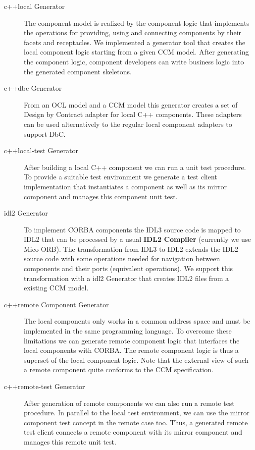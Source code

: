 \begin{description}
\item [c++local Generator]
The component model is realized by the component logic that implements the
operations for providing, using and connecting components by their facets and
receptacles. We implemented a generator tool that creates the local component
logic starting from a given CCM model. After generating the component logic, 
component developers can write business logic into the generated
component skeletons.

\item [c++dbc Generator]
From an OCL model and a CCM model this generator creates a set of
Design by Contract adapter for local C++ components.
These adapters can be used alternatively to the regular local component
adapters to support DbC.

\item [c++local-test Generator]
After building a local C++ component we can run a unit test procedure. To
provide a suitable test environment we generate a test client implementation
that instantiates a component as well as its mirror component and manages this 
component unit test. 

\item [idl2 Generator]
To implement CORBA components the IDL3 source code is mapped to IDL2 that can be
processed by a usual {\bf IDL2 Compiler} (currently we use Mico ORB). The
transformation from IDL3 to IDL2 extends the IDL2 source code with some operations 
needed for navigation between components and their ports (equivalent operations). 
We support this transformation with a idl2 Generator that creates IDL2 files from 
a existing CCM model.

\item [c++remote Component Generator]
The local components only works in a common address space and must be
implemented in the same programming language. To overcome these limitations we
can generate remote component logic that interfaces the local components with CORBA.
The remote component logic is thus a superset of the local component logic. Note
that the external view of such a remote component quite conforms to the CCM
specification.

\item [c++remote-test Generator]
After generation of remote components we can also run a remote test procedure.
In parallel to the local test environment, we can use the mirror component test 
concept in the remote case too.
Thus, a generated remote test client connects a remote component with its
mirror component and manages this remote unit test. 
\end{description}


